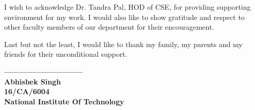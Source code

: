 \documentclass[12pt, a4paper, oneside]{Thesis} %
\begin{document}
{{I wish to acknowledge Dr. Tandra Pal, HOD of CSE, for providing supporting environment for my work. I would also like to show gratitude and respect to other faculty members of our department for their encouragement.

Last but not the least, I would like to thank my family, my parents and my friends for their unconditional support.

\vspace{200px}

\textbf{
-----------------------------\\
Abhishek Singh\\
16/CA/6004\\
National Institute Of Technology\\
}

}
\clearpage %


\pagestyle{fancy} %

\tableofcontents %







}
\end{document}
